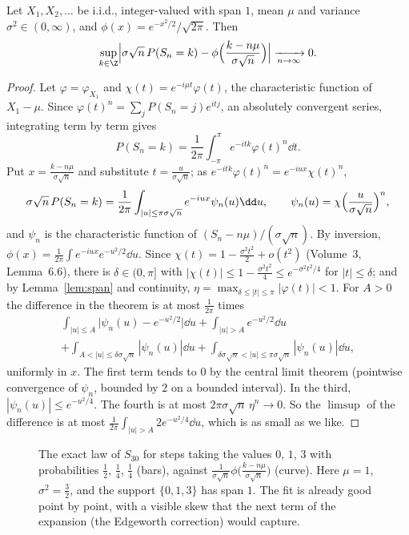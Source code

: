 \begin{theorem}\label{thm:llt}
Let $X_1,X_2,\dots$ be i.i.d., integer-valued with span $1$, mean $\mu$ and variance $\sigma^2\in(0,\infty)$, and $\phi(x)=e^{-x^2/2}/\sqrt{2\pi}$. Then
\[
\sup_{k\in\Z}\Bigl|\sigma\sqrt n\,P(S_n=k)-\phi\Bigl(\frac{k-n\mu}{\sigma\sqrt n}\Bigr)\Bigr|\xrightarrow[n\to\infty]{}0.
\]
\end{theorem}
\begin{proof}
Let $\varphi=\varphi_{X_1}$ and $\chi(t)=e^{-i\mu t}\varphi(t)$, the characteristic function of $X_1-\mu$. Since $\varphi(t)^n=\sum_jP(S_n=j)e^{itj}$, an absolutely
convergent series, integrating term by term gives
\[
P(S_n=k)=\frac1{2\pi}\int_{-\pi}^\pi e^{-itk}\varphi(t)^n\dd t.
\]
Put $x=\frac{k-n\mu}{\sigma\sqrt n}$ and substitute $t=\frac u{\sigma\sqrt n}$; as $e^{-itk}\varphi(t)^n=e^{-iux}\chi(t)^n$,
\[
\sigma\sqrt n\,P(S_n=k)=\frac1{2\pi}\int_{|u|\le\pi\sigma\sqrt n}e^{-iux}\psi_n(u)\dd u,\qquad\psi_n(u)=\chi\Bigl(\frac u{\sigma\sqrt n}\Bigr)^n,
\]
and $\psi_n$ is the characteristic function of $(S_n-n\mu)/(\sigma\sqrt n)$. By inversion, $\phi(x)=\frac1{2\pi}\int e^{-iux}e^{-u^2/2}\dd u$. Since
$\chi(t)=1-\frac{\sigma^2t^2}2+o(t^2)$ (Volume~3, Lemma~6.6), there is $\delta\in(0,\pi]$ with $|\chi(t)|\le1-\frac{\sigma^2t^2}4\le e^{-\sigma^2t^2/4}$ for
$|t|\le\delta$; and by Lemma~\ref{lem:span} and continuity, $\eta=\max_{\delta\le|t|\le\pi}|\varphi(t)|<1$. For $A>0$ the difference in the theorem is
at most $\frac1{2\pi}$ times
\[
\begin{gathered}
\int_{|u|\le A}\bigl|\psi_n(u)-e^{-u^2/2}\bigr|\dd u+\int_{|u|>A}e^{-u^2/2}\dd u\\
+\int_{A<|u|\le\delta\sigma\sqrt n}|\psi_n(u)|\dd u+\int_{\delta\sigma\sqrt n<|u|\le\pi\sigma\sqrt n}|\psi_n(u)|\dd u,
\end{gathered}
\]
uniformly in $x$. The first term tends to $0$ by the central limit theorem (pointwise convergence of $\psi_n$, bounded by $2$ on a bounded interval).
In the third, $|\psi_n(u)|\le e^{-u^2/4}$. The fourth is at most $2\pi\sigma\sqrt n\,\eta^n\to0$. So the $\limsup$ of the difference is at most
$\frac1{2\pi}\int_{|u|>A}2e^{-u^2/4}\dd u$, which is as small as we like.
\end{proof}

\begin{figure}[ht]
\centering{}
\caption{The exact law of $S_{30}$ for steps taking the values $0$, $1$, $3$ with probabilities $\frac12$, $\frac14$, $\frac14$ (bars), against
$\frac1{\sigma\sqrt n}\phi\bigl(\frac{k-n\mu}{\sigma\sqrt n}\bigr)$ (curve). Here $\mu=1$, $\sigma^2=\frac32$, and the support $\{0,1,3\}$ has span $1$.
The fit is already good point by point, with a visible skew that the next term of the expansion (the Edgeworth correction) would capture.}
\label{fig:llt}
\end{figure}

